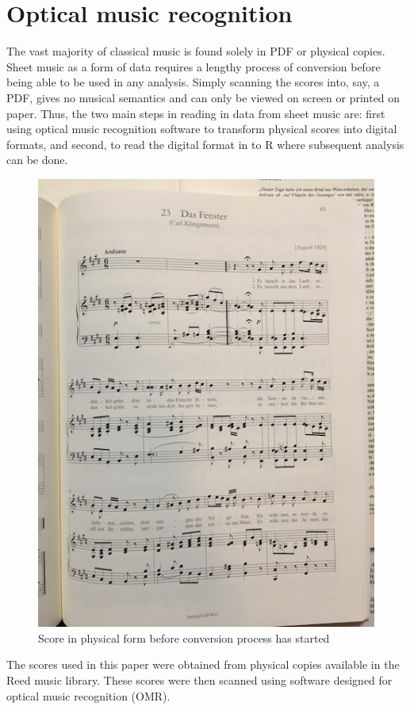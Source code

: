 \documentclass[12pt,twoside]{reedthesis}
\theoremstyle{definition}
\theoremstyle{definition}
\theoremstyle{definition}
\theoremstyle{remark}
\begin{document}
\section{Optical music recognition}\label{optical-music-recognition}

The vast majority of classical music is found solely in PDF or physical
copies. Sheet music as a form of data requires a lengthy process of
conversion before being able to be used in any analysis. Simply scanning
the scores into, say, a PDF, gives no musical semantics and can only be
viewed on screen or printed on paper. Thus, the two main steps in
reading in data from sheet music are: first using optical music
recognition software to transform physical scores into digital formats,
and second, to read the digital format in to R where subsequent analysis
can be done.
\begin{figure}[h]
\centering
\includegraphics[scale=.50]{images/scorephoto.JPG}
\caption{Score in physical form before conversion process has started}
\label{subd}
\end{figure}
The scores used in this paper were obtained from physical copies
available in the Reed music library. These scores were then scanned
using software designed for optical music recognition (OMR).
\end{document}
